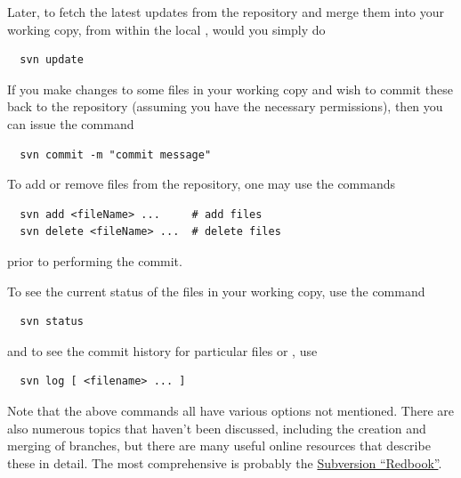 Later, to fetch the latest updates from the repository and
merge them into your working copy, from within the local
\directory{}, would you simply do
\begin{verbatim}
  svn update
\end{verbatim}

If you make changes to some files in your working copy and wish to
commit these back to the repository (assuming you have the necessary
permissions), then you can issue the command
\begin{verbatim}
  svn commit -m "commit message"
\end{verbatim}
To add or remove files from the repository, one may use
the commands
\begin{verbatim}
  svn add <fileName> ...     # add files
  svn delete <fileName> ...  # delete files
\end{verbatim}
prior to performing the commit.

To see the current status of the files in your working copy,
use the command
\begin{verbatim}
  svn status
\end{verbatim}
and to see the commit history for particular files or \directories{},
use 
\begin{verbatim}
  svn log [ <filename> ... ]
\end{verbatim}

Note that the above commands all have various options not mentioned.
There are also numerous topics that haven't been discussed, including
the creation and merging of branches, but there are many useful online
resources that describe these in detail. The most comprehensive
is probably the \href{http://svnbook.red-bean.com}{Subversion ``Redbook''}.



%
%
%
%
%
%
%
%
%
%

